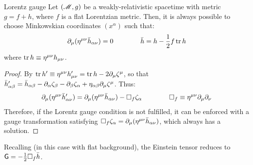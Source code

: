 \begin{lemma}{Lorentz gauge}{}
  Let $ (\mathscr{M} , g) $ be a weakly-relativistic spacetime with metric $ g = f + h $, where $ f $ is a flat Lorentzian metric. Then, it is always possible to choose Minkowskian coordinates $ (x^\alpha) $ such that:
  \begin{equation}
    \partial_\mu (\eta^{\mu \nu} \bar{h}_{\alpha \nu}) = 0
    \qquad \qquad
    \bar{h} = h - \frac{1}{2} f \operatorname{tr} h
  \end{equation}
  where $ \operatorname{tr} h \equiv \eta^{\mu \nu} h_{\mu \nu} $.
\end{lemma}

\begin{proofbox}
  \begin{proof}
    By  $ \operatorname{tr} h' \equiv \eta^{\mu \nu} h'_{\mu \nu} = \operatorname{tr} h - 2 \partial_\mu \zeta^\mu $, so that $ \bar{h}'_{\alpha \beta} = \bar{h}_{\alpha \beta} - \partial_\alpha \zeta_\beta - \partial_\beta \zeta_\alpha + \eta_{\alpha \beta} \partial_\mu \zeta^\mu $. Thus:
    \begin{equation*}
      \partial_\mu (\eta^{\mu \nu} \bar{h}'_{\alpha \nu}) = \partial_\mu (\eta^{\mu \nu} \bar{h}_{\alpha \nu}) - \Box_f \zeta_\alpha
      \qquad \qquad
      \Box_f \equiv \eta^{\mu \nu} \partial_\mu \partial_\nu
    \end{equation*}
    Therefore, if the Lorentz gauge condition is not fulfilled, it can be enforced with a gauge transformation satisfying $ \Box_f \zeta_\alpha = \partial_\mu (\eta^{\mu \nu} \bar{h}_{\alpha \nu}) $, which always has a solution.
  \end{proof}
\end{proofbox}

Recalling  (in this case with flat background), the Einstein tensor reduces to $ \textsf{G} = - \frac{1}{2} \Box_f \bar{h} $.

